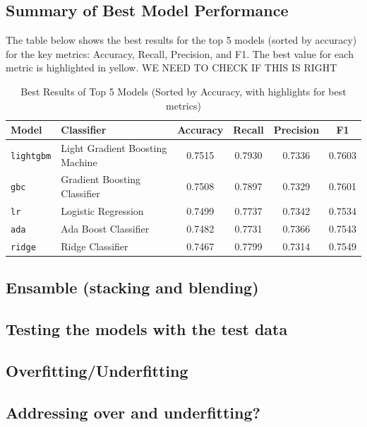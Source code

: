 \documentclass[a4paper,12pt]{article}
\begin{document}
\subsection{Summary of Best Model Performance}



The table below shows the best results for the top 5 models (sorted by accuracy) for the key metrics: Accuracy, Recall, Precision, and F1. The best value for each metric is highlighted in yellow.
WE NEED TO CHECK IF THIS IS RIGHT
\begin{table}[h!]
\centering
\begin{tabular}{l l c c c c}
\toprule
\textbf{Model} & \textbf{Classifier} & \textbf{Accuracy} & \textbf{Recall} & \textbf{Precision} & \textbf{F1} \\
\midrule
\texttt{lightgbm} & Light Gradient Boosting Machine & \cellcolor{yellow}0.7515 & \cellcolor{yellow}0.7930 & 0.7336 & \cellcolor{yellow}0.7603 \\  %
\texttt{gbc}    & Gradient Boosting Classifier & 0.7508 & 0.7897 & 0.7329 & 0.7601 \\  %
\texttt{lr}     & Logistic Regression & 0.7499 & 0.7737 & 0.7342 & 0.7534 \\  %
\texttt{ada}    & Ada Boost Classifier & 0.7482 & 0.7731 & \cellcolor{yellow}0.7366 & 0.7543 \\  %
\texttt{ridge}  & Ridge Classifier & 0.7467 & 0.7799 & 0.7314 & 0.7549 \\  %
\bottomrule
\end{tabular}
\caption{Best Results of Top 5 Models (Sorted by Accuracy, with highlights for best metrics)}
\label{tab:best_model_performance}
\end{table}
\subsection{Ensamble (stacking and blending)}
\subsection{Testing the models with the test data}
\subsection{Overfitting/Underfitting}
\subsection{Addressing over and underfitting?}
\end{document}
